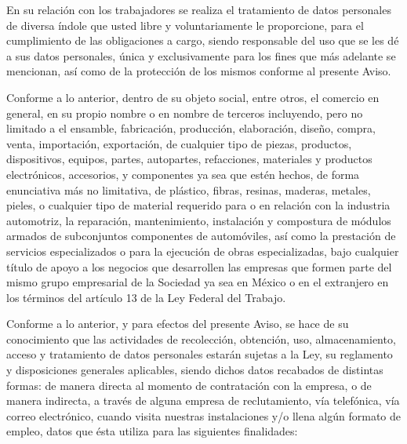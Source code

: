 \documentclass[letterpaper,12pt]{article}
\begin{document}
\begin{sloppypar}
\begin{enumerate}
    En su relación con los trabajadores se realiza el tratamiento de datos personales de diversa índole que usted libre y voluntariamente le proporcione, para el cumplimiento de las obligaciones a cargo, siendo responsable del uso que se les dé a sus datos personales, única y exclusivamente para los fines que más adelante se mencionan, así como de la protección de los mismos conforme al presente Aviso. 
    
    Conforme a lo anterior, dentro de su objeto social, entre otros, el comercio en general, en su propio nombre o en nombre de terceros incluyendo, pero no limitado a el ensamble, fabricación, producción, elaboración, diseño, compra, venta, importación, exportación, de cualquier tipo de piezas, productos, dispositivos, equipos, partes, autopartes, refacciones, materiales y productos electrónicos, accesorios, y componentes ya sea que estén hechos, de forma enunciativa más no limitativa, de plástico, fibras, resinas, maderas, metales, pieles, o cualquier tipo de material requerido para o en relación con la industria automotriz, la reparación, mantenimiento, instalación y compostura de módulos armados de subconjuntos componentes de automóviles, así como la prestación de servicios especializados o para la ejecución de obras especializadas, bajo cualquier título de apoyo a los negocios que desarrollen las empresas que formen parte del mismo grupo empresarial de la Sociedad ya sea en México o en el extranjero en los términos del artículo 13 de la Ley Federal del Trabajo.

    Conforme a lo anterior, y para efectos del presente Aviso, se hace de su conocimiento que las actividades de recolección, obtención, uso, almacenamiento, acceso y tratamiento de datos personales estarán sujetas a la Ley, su reglamento y disposiciones generales aplicables, siendo
    dichos datos recabados de distintas formas: de manera directa al momento de contratación con la empresa, o de manera indirecta, a través de alguna empresa de reclutamiento, vía telefónica, vía correo electrónico, cuando visita nuestras instalaciones y/o llena algún formato de empleo, datos que ésta utiliza para las siguientes finalidades:


\end{enumerate}
\end{sloppypar}
\end{document}
